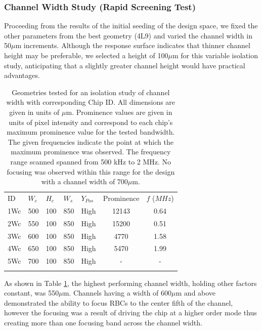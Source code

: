 \subsubsection{Channel Width Study (Rapid Screening Test)}
\label{sssec:width}

Proceeding from the  results of the initial seeding of the design space,  we fixed the other parameters from the best geometry (4L9) and varied the channel width in 50$\mu$m increments.  Although the response surface indicates that thinner channel height may be preferable,  we selected a height of 100$\mu$m for this variable isolation study, anticipating that a slightly greater channel height would have practical advantages. 

\begin{table}[h]
	\caption[Geometries tested for an isolation study of channel width]{Geometries tested for an isolation study of channel width with corresponding Chip ID. All dimensions are given in units of $\mu$m. Prominence values are given in units of pixel intensity and correspond to each chip's maximum prominence value for the tested bandwidth. The given frequencies indicate the point at which the maximum prominence was observed. The frequency range scanned spanned from 500 kHz to 2 MHz. No focusing was observed within this range for the design with a channel width of 700$\mu$m. }   
\label{tab:width}       %
\centering
\begin{tabular}{lllll|cc}
\hline\noalign{\smallskip}
ID & $W_c$ & $H_c$ & $W_s$ & $Y_{Pos}$ & Prominence & $f$ ($MHz$)\\
\noalign{\smallskip}\hline\noalign{\smallskip}
1Wc & 500 & 100 & 850 & High & 12143 & 0.64\\
2Wc & 550 & 100 & 850 & High & 15200 & 0.51\\
3Wc & 600 & 100 & 850 & High & 4770 & 1.58\\
4Wc & 650 & 100 & 850 & High & 5470 & 1.99\\
5Wc & 700 & 100 & 850 & High & - & - \\
\noalign{\smallskip}\hline
\end{tabular}
\end{table}

As shown in Table \ref{tab:width}, the highest performing channel width, holding other factors constant, was 550$\mu$m. Channels having a width of 600$\mu$m and above demonstrated the ability to focus RBCs to the center fifth of the channel, however the focusing was a result of driving the chip at a higher order mode thus creating more than one focusing band across the channel width. 

